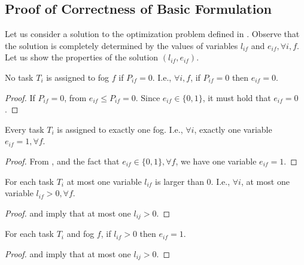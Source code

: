 \subsection{Proof of Correctness of Basic Formulation}

Let us consider a solution to the optimization problem defined in . Observe that the solution is completely determined by the values of variables $l_{if}$ and $e_{if}, \forall i,f$.
Let us show the properties of the solution $(l_{if}, e_{if})$.

\begin{lemma}
\label{lem:pif}
        No task $T_i$ is assigned to fog $f$ if $P_{if}=0$. I.e., $\forall i,f$, if $P_{if}=0$ then $e_{if} = 0$.
\end{lemma}
\begin{proof}
If $P_{if}=0$, from  $e_{if} \leq P_{if}= 0$. Since $e_{if} \in \{0,1\}$, it must hold that $e_{if} = 0$. 
\end{proof}

\begin{lemma}
\label{lem:eif}
    Every task $T_i$ is assigned to exactly one fog. I.e., $\forall i$, exactly one variable $e_{if}=1, \forall f$.
\end{lemma}
\begin{proof}
From , and the fact that $e_{if} \in \{0,1\}, \forall f$, 
we have one variable $e_{if}=1$. 
\end{proof}

\begin{lemma}
\label{lem:lifnozero}
For each task $T_i$ at most one variable $l_{if}$ is larger than 0. I.e., $\forall i$, at most one variable $l_{if} > 0, \forall f$.
\end{lemma}
\begin{proof}
 and  imply that at most one $l_{ij}>0$.
\end{proof}

\begin{lemma}
\label{lem:ewhenl}
For each task $T_i$ and fog $f$, if $l_{if}>0$ then $e_{if} = 1$.
\end{lemma}
\begin{proof}
 and  imply that at most one $l_{ij}>0$.
\end{proof}

